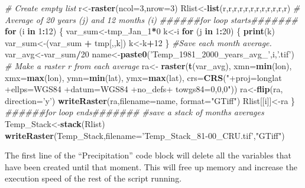 \documentclass[
  10pt,
  b5paper,
]{book}
\newenvironment{Shaded}{\begin{snugshade}}{\end{snugshade}}
\newcommand{\CommentTok}[1]{\textcolor[rgb]{0.56,0.35,0.01}{\textit{#1}}}
\newcommand{\ControlFlowTok}[1]{\textcolor[rgb]{0.13,0.29,0.53}{\textbf{#1}}}
\newcommand{\DataTypeTok}[1]{\textcolor[rgb]{0.13,0.29,0.53}{#1}}
\newcommand{\DecValTok}[1]{\textcolor[rgb]{0.00,0.00,0.81}{#1}}
\newcommand{\KeywordTok}[1]{\textcolor[rgb]{0.13,0.29,0.53}{\textbf{#1}}}
\newcommand{\NormalTok}[1]{#1}
\newcommand{\OperatorTok}[1]{\textcolor[rgb]{0.81,0.36,0.00}{\textbf{#1}}}
\newcommand{\StringTok}[1]{\textcolor[rgb]{0.31,0.60,0.02}{#1}}
\begin{document}
\begin{Shaded}
\begin{Highlighting}[]
\CommentTok{# Create empty list}
\NormalTok{r<-}\KeywordTok{raster}\NormalTok{(}\DataTypeTok{ncol=}\DecValTok{3}\NormalTok{,}\DataTypeTok{nrow=}\DecValTok{3}\NormalTok{)}
\NormalTok{Rlist<-}\KeywordTok{list}\NormalTok{(r,r,r,r,r,r,r,r,r,r,r,r)}
 \CommentTok{# Average of 20 years (j)  and 12 months (i) }
\CommentTok{######for loop starts#######}
 \ControlFlowTok{for}\NormalTok{ (i }\ControlFlowTok{in} \DecValTok{1}\OperatorTok{:}\DecValTok{12}\NormalTok{) \{ }
\NormalTok{var_sum<-tmp_Jan_}\DecValTok{1}\OperatorTok{*}\DecValTok{0}
\NormalTok{k<-i}
 \ControlFlowTok{for}\NormalTok{ (j }\ControlFlowTok{in} \DecValTok{1}\OperatorTok{:}\DecValTok{20}\NormalTok{) \{}
\KeywordTok{print}\NormalTok{(k)}
\NormalTok{var_sum<-(var_sum }\OperatorTok{+}\StringTok{ }\NormalTok{tmp[,,k])}
\NormalTok{ k<-k}\OperatorTok{+}\DecValTok{12}
\NormalTok{ \}}
\CommentTok{#Save each month average. }
\NormalTok{ var_avg<-var_sum}\OperatorTok{/}\DecValTok{20}
\NormalTok{name<-}\KeywordTok{paste0}\NormalTok{(}\StringTok{'Temp_1981_2000_years_avg_'}\NormalTok{,i,}\StringTok{'.tif'}\NormalTok{)}
 \CommentTok{# Make a raster r from each average}
\NormalTok{ra<-}\StringTok{ }\KeywordTok{raster}\NormalTok{(}\KeywordTok{t}\NormalTok{(var_avg), }\DataTypeTok{xmn=}\KeywordTok{min}\NormalTok{(lon), }\DataTypeTok{xmx=}\KeywordTok{max}\NormalTok{(lon), }\DataTypeTok{ymn=}\KeywordTok{min}\NormalTok{(lat), }\DataTypeTok{ymx=}\KeywordTok{max}\NormalTok{(lat), }\DataTypeTok{crs=}\KeywordTok{CRS}\NormalTok{(}\StringTok{"+proj=longlat +ellps=WGS84 +datum=WGS84 +no_defs+ towgs84=0,0,0"}\NormalTok{))}
\NormalTok{ra<-}\KeywordTok{flip}\NormalTok{(ra, }\DataTypeTok{direction=}\StringTok{'y'}\NormalTok{)}
\KeywordTok{writeRaster}\NormalTok{(ra,}\DataTypeTok{filename=}\NormalTok{name, }\DataTypeTok{format=}\StringTok{"GTiff"}\NormalTok{)}
\NormalTok{Rlist[[i]]<-ra}
\NormalTok{\}}
\CommentTok{######for loop ends#######}
 \CommentTok{#save a stack of months averages}
\NormalTok{ Temp_Stack<-}\KeywordTok{stack}\NormalTok{(Rlist)}
\KeywordTok{writeRaster}\NormalTok{(Temp_Stack,}\DataTypeTok{filename=}\StringTok{'Temp_Stack_81-00_CRU.tif'}\NormalTok{,}\StringTok{"GTiff"}\NormalTok{)}
\end{Highlighting}
\end{Shaded}

The first line of the ``Precipitation'' code block will delete all the variables that have been created until that moment. This will free up memory and increase the execution speed of the rest of the script running.
\end{document}
